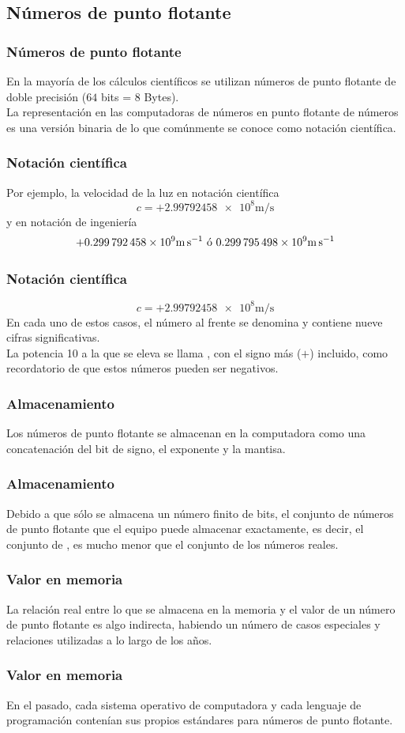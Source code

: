 \subsection{Números de punto flotante}
\begin{frame}
\frametitle{Números de punto flotante}
En la mayoría de los cálculos científicos se utilizan números de punto flotante de doble precisión ($64$ bits = 8 Bytes).
\\
\bigskip
La representación en las computadoras de números en punto flotante de números es una versión binaria de lo que comúnmente se conoce como notación científica.
\end{frame}
\begin{frame}
\frametitle{Notación científica}
Por ejemplo, la velocidad de la luz en notación científica
\[ c = + \num{2.99792458e8} \si{\meter\per\second} \]
y en notación de ingeniería
\[ + \num{	0.299792458e9} \si{\meter\per\second} \mbox{ ó } \num{0.299795498E9} \si{\meter\per\second} \]
\end{frame}
\begin{frame}
\frametitle{Notación científica}
\[ c = + \num{2.99792458e8} \si{\meter\per\second} \]
En cada uno de estos casos, el número al frente se denomina  y contiene nueve cifras significativas.
\\
\bigskip
La potencia 10 a la que se eleva se llama , con el signo más ($+$) incluido, como recordatorio de que estos números pueden ser negativos.
\end{frame}
\begin{frame}
\frametitle{Almacenamiento}
Los números de punto flotante se almacenan en la computadora como una concatenación del bit de signo, el exponente y la mantisa.
\end{frame}
\begin{frame}
\frametitle{Almacenamiento}
Debido a que sólo se almacena un número finito de bits, el conjunto de números de punto flotante que el equipo puede almacenar exactamente, es decir, el conjunto de , es mucho menor que el conjunto de los números reales.
\end{frame}
\begin{frame}
\frametitle{Valor en memoria}
La relación real entre lo que se almacena en la memoria y el valor de un número de punto flotante es algo indirecta, habiendo un número de casos especiales y relaciones utilizadas a lo largo de los años.
\end{frame}
\begin{frame}
\frametitle{Valor en memoria}
En el pasado, cada sistema operativo de computadora y cada lenguaje de programación contenían sus propios estándares para números de punto flotante.
\end{frame}
